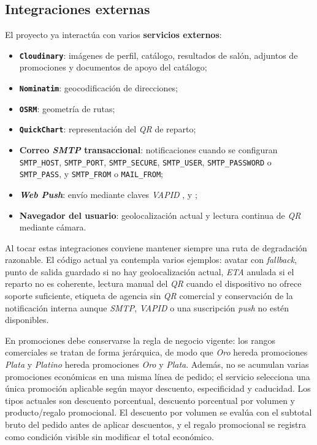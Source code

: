 \subsection{Integraciones externas}

El proyecto ya interactúa con varios \textbf{servicios externos}:

\begin{itemize}
    \item \textbf{\texttt{Cloudinary}}: imágenes de perfil, catálogo, resultados de salón, adjuntos de promociones y documentos de apoyo del catálogo;
    \item \textbf{\texttt{Nominatim}}: geocodificación de direcciones;
    \item \textbf{\texttt{OSRM}}: geometría de rutas;
    \item \textbf{\texttt{QuickChart}}: representación del \textit{QR} de reparto;
    \item \textbf{Correo \textit{SMTP} transaccional}: notificaciones cuando se configuran \texttt{SMTP\_HOST}, \texttt{SMTP\_PORT}, \texttt{SMTP\_SECURE}, \texttt{SMTP\_USER}, \texttt{SMTP\_PASSWORD} o \texttt{SMTP\_PASS}, y \texttt{SMTP\_FROM} o \texttt{MAIL\_FROM};
    \item \textbf{\textit{Web Push}}: envío mediante claves \textit{VAPID} ,  y ;
    \item \textbf{Navegador del usuario}: geolocalización actual y lectura continua de \textit{QR} mediante cámara.
\end{itemize}

Al tocar estas integraciones conviene mantener siempre una ruta de degradación razonable. El código actual ya contempla varios ejemplos: avatar con \textit{fallback}, punto de salida guardado si no hay geolocalización actual, \textit{ETA} anulada si el reparto no es coherente, lectura manual del \textit{QR} cuando el dispositivo no ofrece soporte suficiente, etiqueta de agencia sin \textit{QR} comercial y conservación de la notificación interna aunque \textit{SMTP}, \textit{VAPID} o una suscripción \textit{push} no estén disponibles.

En promociones debe conservarse la regla de negocio vigente: los rangos comerciales se tratan de forma jerárquica, de modo que \textit{Oro} hereda promociones \textit{Plata} y \textit{Platino} hereda promociones \textit{Oro} y \textit{Plata}. Además, no se acumulan varias promociones económicas en una misma línea de pedido; el servicio selecciona una única promoción aplicable según mayor descuento, especificidad y caducidad. Los tipos actuales son descuento porcentual, descuento porcentual por volumen y producto/regalo promocional. El descuento por volumen se evalúa con el subtotal bruto del pedido antes de aplicar descuentos, y el regalo promocional se registra como condición visible sin modificar el total económico.

